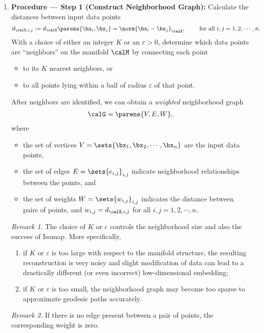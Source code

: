 \documentclass[12pt]{article}
\begin{document}
\begin{enumerate}[label=\textbf{\arabic*.}]
	\item \textbf{Procedure --- Step 1 (Construct Neighborhood Graph):} Calculate the distances between input data points 
	\begin{align*}
		d_{\calX,i,j} := d_{\calX} \parens{\bx_i, \bx_j} = \norm{\bx_i - \bx_j}_{\calX}, \qquad \text{ for all } i, j = 1, 2, \cdots, n. 
	\end{align*}
	With a choice of either an integer $K$ or an $\varepsilon > 0$, determine which data points are ``neighbors'' on the manifold $\calM$ by connecting each point 
	\begin{itemize}
		\item to its $K$ nearest neighbors, or 
		\item to all points lying within a ball of radius $\varepsilon$ of that point. 
	\end{itemize}
	After neighbors are identified, we can obtain a \emph{weighted} neighborhood graph 
	\begin{align*}
		\calG = \parens{V, E, W}, 
	\end{align*}
	where 
	\begin{itemize}
		\item the set of vertices $V = \sets{\bx_1, \bx_2, \cdots, \bx_n}$ are the input data points, 
		\item the set of edges $E = \sets{e_{i,j}}_{i,j}$ indicate neighborhood relationships between the points, and 
		\item the set of weights $W = \sets{w_{i,j}}_{i,j}$ indicates the distance between pairs of points, and $w_{i,j} = d_{\calX,i,j}$ for all $i, j = 1, 2, \cdots, n$. 
	\end{itemize}
	
	\textit{Remark 1.} The choice of $K$ or $\varepsilon$ controls the neighborhood size and also the success of Isomap. More specifically, 
	\begin{enumerate}
		\item if $K$ or $\varepsilon$ is too large with respect to the manifold structure, the resulting reconstruction is very noisy and slight modification of data can lead to a drastically different (or even incorrect) low-dimensional embedding; 
		\item if $K$ or $\varepsilon$ is too small, the neighborhood graph may become too sparse to approximate geodesic paths accurately. 
	\end{enumerate}
	
	\textit{Remark 2.} If there is no edge present between a pair of points, the corresponding weight is zero. 
	

\end{enumerate}
\end{document}
